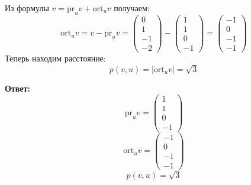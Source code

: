 \documentclass[a4paper,12pt]{article}
\begin{document}
Из формулы $v = \text{pr}_u v + \text{ort}_u v$ получаем:
\[
\text{ort}_u v = v - \text{pr}_u v  = \begin{pmatrix}
0 \\ 1 \\ -1 \\ -2
\end{pmatrix}
 - \begin{pmatrix}
1 \\ 1 \\ 0 \\ -1
\end{pmatrix}
= 
\begin{pmatrix}
-1 \\ 0 \\ -1 \\ -1
\end{pmatrix}
\]
Теперь находим расстояние:
\[
p(v, u) = |\text{ort}_u v| = \sqrt{3} 
\]
{\Large \begin{center}
\textbf{Ответ: } 
\[
\text{pr}_u v = \begin{pmatrix}
1 \\ 1 \\ 0 \\ -1
\end{pmatrix}
\]
\[
\text{ort}_u v = \begin{pmatrix}
-1 \\ 0 \\ -1 \\ -1
\end{pmatrix}
\]
\[
p(v, u) = \sqrt{3} 
\]
\end{center}}
\clearpage
\end{document}
